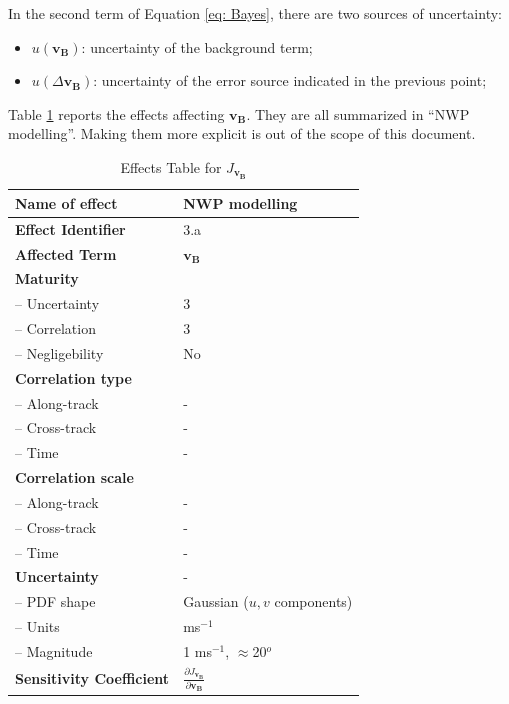 In the second term of Equation \ref{eq: Bayes}, there are two sources of uncertainty:
\begin{itemize}
	\item $u(\mathbf{v_{B}})$: uncertainty of the background term;
	\item $u(\Delta \mathbf{v_{B}})$: uncertainty of the error source indicated in the previous point;
\end{itemize}

Table \ref{tab: effects JvB} reports the effects affecting $\mathbf{v_{B}}$. They are all summarized in ``\ac{NWP} modelling''. Making them more explicit is out of the scope of this document.

\begin{table}[h]
	\centering
	\scriptsize %
	\setlength{\tabcolsep}{2pt} %
	\caption{Effects Table for $J_{\mathbf{v_{B}}}$}
	
	\begin{tabularx}{\textwidth}{l | X}
		\toprule
		\textbf{Name of effect} & NWP modelling \\
		\midrule
		\textbf{Effect Identifier} & 3.a \\
		\midrule
		\textbf{Affected Term} & $\mathbf{v_{B}}$ \\
		\midrule
		\textbf{Maturity} & \\
		\quad -- Uncertainty & 3 \\
		\quad -- Correlation & 3 \\
		\quad -- Negligebility & No \\
		\midrule
		\textbf{Correlation type} & \\
		\quad -- Along-track & - \\
		\quad -- Cross-track & - \\
		\quad -- Time & - \\
		\midrule
		\textbf{Correlation scale} & \\
		\quad -- Along-track & - \\
		\quad -- Cross-track & - \\
		\quad -- Time & - \\
		\midrule
		\textbf{Uncertainty} & - \\
		\quad -- PDF shape & Gaussian ($u,v$ components) \\
		\quad -- Units & ms$^{-1}$ \\
		\quad -- Magnitude & 1 ms$^{-1}$, $\approx$20$^{o}$ \\
		\midrule
		\textbf{Sensitivity Coefficient} & $\frac{\partial J_{\mathbf{v_{B}}}}{\partial \mathbf{v_{B}}}$ \\
		\bottomrule
	\end{tabularx}
	\label{tab: effects JvB}
\end{table}

